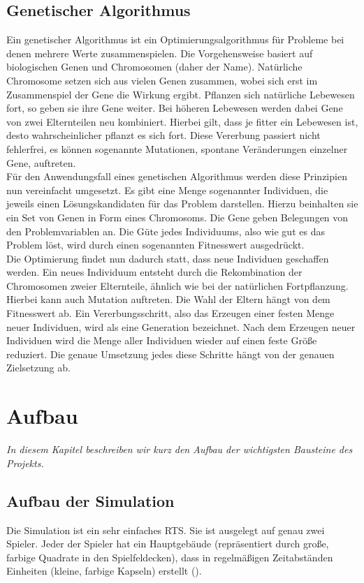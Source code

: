 \documentclass[
	12pt,
	a4paper,
	BCOR10mm,
	DIV14,
	headsepline,
	usegeometry,
]{scrreprt}
\begin{document}
\section{Genetischer Algorithmus}
Ein genetischer Algorithmus ist ein Optimierungsalgorithmus für Probleme bei denen mehrere Werte zusammenspielen. Die Vorgehensweise basiert auf biologischen Genen und Chromosomen (daher der Name). Natürliche Chromosome setzen sich aus vielen Genen zusammen, wobei sich erst im Zusammenspiel der Gene die Wirkung ergibt. Pflanzen sich natürliche Lebewesen fort, so geben sie ihre Gene weiter. Bei höheren Lebewesen werden dabei Gene von zwei Elternteilen neu kombiniert. Hierbei gilt, dass je fitter ein Lebewesen ist, desto wahrscheinlicher pflanzt es sich fort. Diese Vererbung passiert nicht fehlerfrei, es können sogenannte Mutationen, spontane Veränderungen einzelner Gene, auftreten.\\
Für den Anwendungsfall eines genetischen Algorithmus werden diese Prinzipien nun vereinfacht umgesetzt. Es gibt eine Menge sogenannter Individuen, die jeweils einen Lösungskandidaten für das Problem darstellen. Hierzu beinhalten sie ein Set von Genen in Form eines Chromosoms. Die Gene geben Belegungen von den Problemvariablen an. Die Güte jedes Individuums, also wie gut es das Problem löst, wird durch einen sogenannten Fitnesswert ausgedrückt.\\
Die Optimierung findet nun dadurch statt, dass neue Individuen geschaffen werden. Ein neues Individuum entsteht durch die Rekombination der Chromosomen zweier Elternteile, ähnlich wie bei der natürlichen Fortpflanzung. Hierbei kann auch Mutation auftreten. Die Wahl der Eltern hängt von dem Fitnesswert ab. Ein Vererbungsschritt, also das Erzeugen einer festen Menge neuer Individuen, wird als eine Generation bezeichnet. Nach dem Erzeugen neuer Individuen wird die Menge aller Individuen wieder auf einen feste Größe reduziert. Die genaue Umsetzung jedes diese Schritte hängt von der genauen Zielsetzung ab.



\chapter{Aufbau}
\label{Aufbau}

\textit{%
In diesem Kapitel beschreiben wir kurz den Aufbau der wichtigsten Bausteine des Projekts.
}

\bigskip



\section{Aufbau der Simulation}
Die Simulation ist ein sehr einfaches RTS. 
Sie ist ausgelegt auf genau zwei Spieler. 
Jeder der Spieler hat ein Hauptgebäude (repräsentiert durch große, farbige Quadrate in den Spielfeldecken), dass in regelmäßigen Zeitabständen Einheiten (kleine, farbige Kapseln) erstellt ().\\
\end{document}
